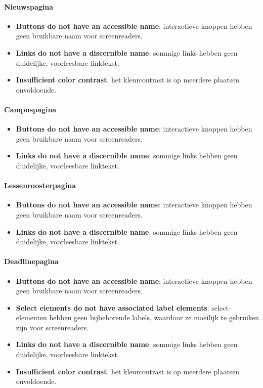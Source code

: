 \paragraph{Nieuwspagina}
\begin{itemize}
\item \textbf{Buttons do not have an accessible name}: interactieve knoppen hebben geen bruikbare naam voor screenreaders.
\item \textbf{Links do not have a discernible name}: sommige links hebben geen duidelijke, voorleesbare linktekst.
\item \textbf{Insufficient color contrast}: het kleurcontrast is op meerdere plaatsen onvoldoende.
\end{itemize}

\paragraph{Campuspagina}
\begin{itemize}
\item \textbf{Buttons do not have an accessible name}: interactieve knoppen hebben geen bruikbare naam voor screenreaders.
\item \textbf{Links do not have a discernible name}: sommige links hebben geen duidelijke, voorleesbare linktekst.
\end{itemize}

\paragraph{Lessenroosterpagina}
\begin{itemize}
\item \textbf{Buttons do not have an accessible name}: interactieve knoppen hebben geen bruikbare naam voor screenreaders.
\item \textbf{Links do not have a discernible name}: sommige links hebben geen duidelijke, voorleesbare linktekst.
\end{itemize}

\paragraph{Deadlinepagina}
\begin{itemize}
\item \textbf{Buttons do not have an accessible name}: interactieve knoppen hebben geen bruikbare naam voor screenreaders.
\item \textbf{Select elements do not have associated label elements}: select-elementen hebben geen bijbehorende labels, waardoor ze moeilijk te gebruiken zijn voor screenreaders.
\item \textbf{Links do not have a discernible name}: sommige links hebben geen duidelijke, voorleesbare linktekst.
\item \textbf{Insufficient color contrast}: het kleurcontrast is op meerdere plaatsen onvoldoende.
\end{itemize}

